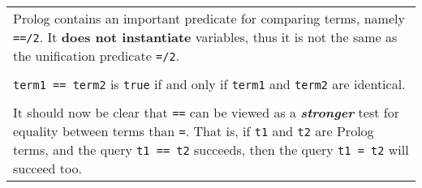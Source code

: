 \begin{frame}
	\frametitle{\insertsection}
	
	\begin{tabular}{m{14cm}}
		Prolog contains an important predicate for comparing terms, namely \texttt{==/2}. It \textbf{does not instantiate} variables, thus it is not the same as the unification predicate \texttt{=/2}.\\ \\
		\texttt{term1 == term2} is \texttt{true} if and only if \texttt{term1} and \texttt{term2} are identical.
		\only<5->{\\ \\ It should now be clear that \texttt{==} can be viewed as a \textit{\textbf{stronger}} test for equality between terms than \texttt{=}. That is, if \texttt{t1} and \texttt{t2} are Prolog terms, and the query \texttt{t1 == t2} succeeds, then the query \texttt{t1 = t2} will succeed too.}
	\end{tabular}
	


	
\end{frame}


